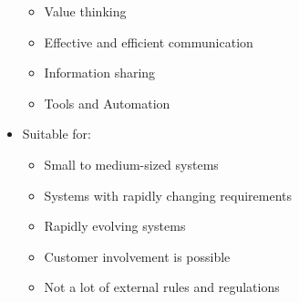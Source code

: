 \documentclass[12pt,openany]{book}
\begin{document}
\begin{itemize}
\begin{itemize}
        \item Value thinking
        \item Effective and efficient communication
        \item Information sharing
        \item Tools and Automation
    \end{itemize}
    \item Suitable for:
    \begin{itemize}
        \item Small to medium-sized systems
        \item Systems with rapidly changing requirements
        \item Rapidly evolving systems
        \item Customer involvement is possible
        \item Not a lot of external rules and regulations
    \end{itemize}
\end{itemize}

\end{document}
